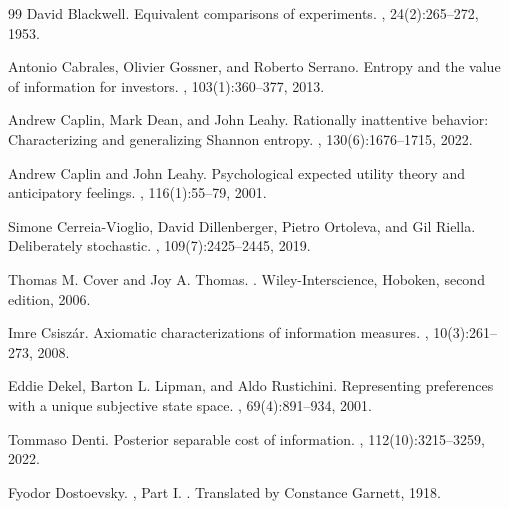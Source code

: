 \documentclass[11pt,a4paper]{article}
\theoremstyle{definition}
\newcommand{\1}{\mathbf 1}
\begin{document}
\begin{thebibliography}{99}
David Blackwell.
\newblock Equivalent comparisons of experiments.
, 24(2):265--272, 1953.


Antonio Cabrales, Olivier Gossner, and Roberto Serrano.
\newblock Entropy and the value of information for investors.
, 103(1):360--377, 2013.

Andrew Caplin, Mark Dean, and John Leahy.
\newblock Rationally inattentive behavior: Characterizing and generalizing {S}hannon entropy.
, 130(6):1676--1715, 2022.

Andrew Caplin and John Leahy.
\newblock Psychological expected utility theory and anticipatory feelings.
, 116(1):55--79, 2001.

Simone Cerreia-Vioglio, David Dillenberger, Pietro Ortoleva, and Gil Riella.
\newblock Deliberately stochastic.
, 109(7):2425--2445, 2019.

Thomas M. Cover and Joy A. Thomas.
.
\newblock Wiley-Interscience, Hoboken, second edition, 2006.

Imre Csisz\'ar.
\newblock Axiomatic characterizations of information measures.
, 10(3):261--273, 2008.

Eddie Dekel, Barton L. Lipman, and Aldo Rustichini.
\newblock Representing preferences with a unique subjective state space.
, 69(4):891--934, 2001.

Tommaso Denti.
\newblock Posterior separable cost of information.
, 112(10):3215--3259, 2022.

Fyodor Dostoevsky.
, Part I.
.  Translated by Constance Garnett, 1918.


\end{thebibliography}
\end{document}
